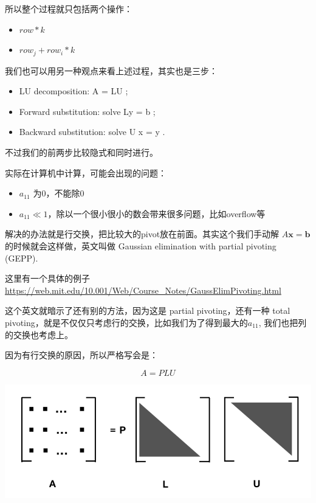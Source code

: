\documentclass[
]{book}
\providecommand{\tightlist}{%
  \setlength{\itemsep}{0pt}\setlength{\parskip}{0pt}}
\begin{document}
所以整个过程就只包括两个操作：

\begin{itemize}
\tightlist
\item
  \(row * k\)
\item
  \(row_j + row_i * k\)
\end{itemize}

我们也可以用另一种观点来看上述过程，其实也是三步：

\begin{itemize}
\tightlist
\item
  LU decomposition: A = LU ;
\item
  Forward substitution: solve Ly = b ;
\item
  Backward substitution: solve U x = y .
\end{itemize}

不过我们的前两步比较隐式和同时进行。

实际在计算机中计算，可能会出现的问题：

\begin{itemize}
\tightlist
\item
  \(a_{11}\) 为0，不能除0
\item
  \(a_{11} \ll 1\)，除以一个很小很小的数会带来很多问题，比如overflow等
\end{itemize}

解决的办法就是行交换，把比较大的pivot放在前面。其实这个我们手动解 \(A\mathbf{x} = \mathbf{b}\) 的时候就会这样做，英文叫做 Gaussian elimination with partial pivoting (GEPP).

这里有一个具体的例子 \url{https://web.mit.edu/10.001/Web/Course_Notes/GaussElimPivoting.html}

这个英文就暗示了还有别的方法，因为这是 partial pivoting，还有一种 total pivoting，就是不仅仅只考虑行的交换，比如我们为了得到最大的\(a_{11}\), 我们也把列的交换也考虑上。

因为有行交换的原因，所以严格写会是：

\[
A = PLU
\]

\includegraphics{images/Gauss_03_APLU.png}
\end{document}

